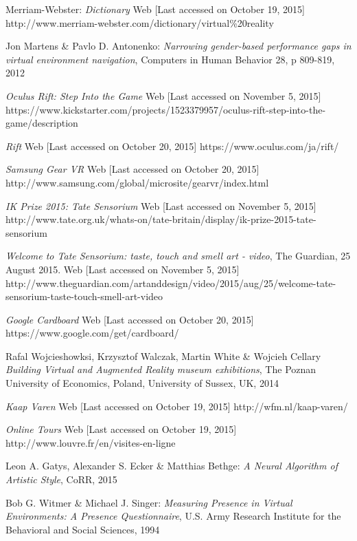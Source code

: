 \documentclass[a4paper]{article}
\begin{document}
\begin{thebibliography}{99}

 Merriam-Webster:
\emph{Dictionary}
Web [Last accessed on October 19, 2015]
http://www.merriam-webster.com/dictionary/virtual\%20reality

 Jon Martens \& Pavlo D. Antonenko:
\emph{Narrowing gender-based performance gaps in virtual environment navigation},
Computers in Human Behavior 28, p 809-819, 2012

\emph{Oculus Rift: Step Into the Game}
Web [Last accessed on November 5, 2015]
https://www.kickstarter.com/projects/1523379957/oculus-rift-step-into-the-game/description

\emph{Rift}
Web [Last accessed on October 20, 2015]
https://www.oculus.com/ja/rift/

\emph{Samsung Gear VR}
Web [Last accessed on October 20, 2015]
http://www.samsung.com/global/microsite/gearvr/index.html


\emph{IK Prize 2015: Tate Sensorium}
Web [Last accessed on November 5, 2015]
http://www.tate.org.uk/whats-on/tate-britain/display/ik-prize-2015-tate-sensorium

\emph{Welcome to Tate Sensorium: taste, touch and smell art - video}, 
The Guardian,  25 August 2015.
Web [Last accessed on November 5, 2015]
http://www.theguardian.com/artanddesign/video/2015/aug/25/welcome-tate-sensorium-taste-touch-smell-art-video


\emph{Google Cardboard}
Web [Last accessed on October 20, 2015]
https://www.google.com/get/cardboard/

 Rafal Wojcieshowksi, Krzysztof Walczak, Martin White \& Wojcieh Cellary
\emph{Building Virtual and Augmented Reality museum exhibitions},
The Poznan University of Economics, Poland,
University of Sussex, UK, 2014

\emph{Kaap Varen}
Web [Last accessed on October 19, 2015]
http://wfm.nl/kaap-varen/

\emph{Online Tours}
Web [Last accessed on October 19, 2015]
http://www.louvre.fr/en/visites-en-ligne

 Leon A. Gatys, Alexander S. Ecker \& Matthias Bethge:
\emph{A Neural Algorithm of Artistic Style},
CoRR, 2015

 Bob G. Witmer \& Michael J. Singer:
\emph{Measuring Presence in Virtual Environments: A Presence Questionnaire},
U.S. Army Research Institute for the Behavioral and Social Sciences, 1994


\end{thebibliography}
\end{document}
